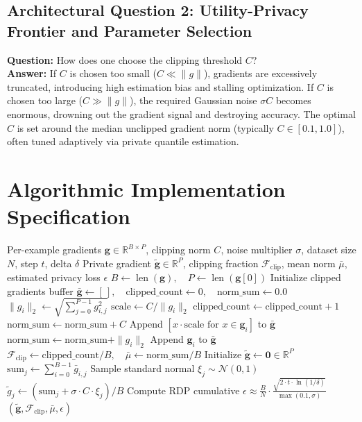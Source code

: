 \documentclass[11pt,a4paper]{article}
\theoremstyle{definition}
\begin{document}
\subsection{Architectural Question 2: Utility-Privacy Frontier and Parameter Selection}
\textbf{Question:} How does one choose the clipping threshold $C$?\\
\textbf{Answer:} If $C$ is chosen too small ($C \ll \|g\|$), gradients are excessively truncated, introducing high estimation bias and stalling optimization. If $C$ is chosen too large ($C \gg \|g\|$), the required Gaussian noise $\sigma C$ becomes enormous, drowning out the gradient signal and destroying accuracy. The optimal $C$ is set around the median unclipped gradient norm (typically $C \in [0.1, 1.0]$), often tuned adaptively via private quantile estimation.

\section{Algorithmic Implementation Specification}

\begin{algorithm}[H]
\caption{Differentially Private SGD (DP-SGD) with Calibrated Gaussian Noise}
\begin{algorithmic}[1]
\Require Per-example gradients $\mathbf{g} \in \mathbb{R}^{B \times P}$, clipping norm $C$, noise multiplier $\sigma$, dataset size $N$, step $t$, delta $\delta$
\Ensure Private gradient $\tilde{\mathbf{g}} \in \mathbb{R}^P$, clipping fraction $\mathcal{F}_{\text{clip}}$, mean norm $\bar{\mu}$, estimated privacy loss $\epsilon$
\State $B \gets \operatorname{len}(\mathbf{g}), \quad P \gets \operatorname{len}(\mathbf{g}[0])$
\State Initialize clipped gradients buffer $\bar{\mathbf{g}} \gets [\,], \quad \text{clipped\_count} \gets 0, \quad \text{norm\_sum} \gets 0.0$
    \State $\|g_i\|_2 \gets \sqrt{\sum_{j=0}^{P-1} g_{i, j}^2}$
        \State $\text{scale} \gets C / \|g_i\|_2$
        \State $\text{clipped\_count} \gets \text{clipped\_count} + 1$
        \State $\text{norm\_sum} \gets \text{norm\_sum} + C$
        \State Append $[ x \cdot \text{scale} \text{ for } x \in \mathbf{g}_i ]$ to $\bar{\mathbf{g}}$
    \Else
        \State $\text{norm\_sum} \gets \text{norm\_sum} + \|g_i\|_2$
        \State Append $\mathbf{g}_i$ to $\bar{\mathbf{g}}$
    \EndIf
\EndFor
\State $\mathcal{F}_{\text{clip}} \gets \text{clipped\_count} / B, \quad \bar{\mu} \gets \text{norm\_sum} / B$
\State Initialize $\tilde{\mathbf{g}} \gets \mathbf{0} \in \mathbb{R}^P$
    \State $\text{sum}_j \gets \sum_{i=0}^{B-1} \bar{g}_{i, j}$
    \State Sample standard normal $\xi_j \sim \mathcal{N}(0, 1)$
    \State $\tilde{g}_j \gets (\text{sum}_j + \sigma \cdot C \cdot \xi_j) / B$
\EndFor
\State Compute RDP cumulative $\epsilon \approx \frac{B}{N} \cdot \frac{\sqrt{2 \cdot t \cdot \ln(1 / \delta)}}{\max(0.1, \sigma)}$
\State \Return $(\tilde{\mathbf{g}}, \mathcal{F}_{\text{clip}}, \bar{\mu}, \epsilon)$
\end{algorithmic}
\end{algorithm}
\end{document}
